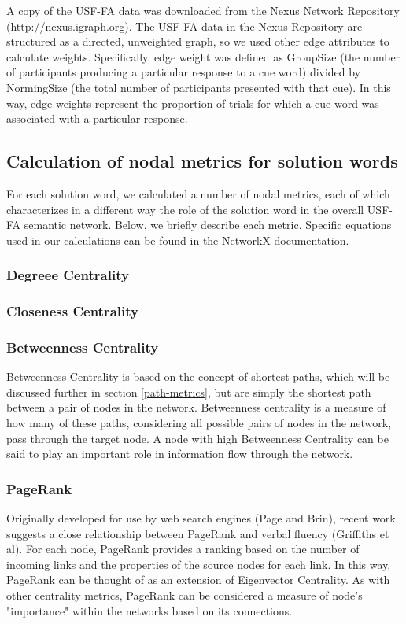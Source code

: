 \documentclass{article} %
\begin{document}
A copy of the USF-FA data was downloaded from the Nexus Network Repository (http://nexus.igraph.org). The USF-FA data in the Nexus Repository are structured as a directed, unweighted graph, so we used other edge attributes to calculate weights. Specifically, edge weight was defined as GroupSize (the number of participants producing a particular response to a cue word) divided by NormingSize (the total number of participants presented with that cue). In this way, edge weights represent the proportion of trials for which a cue word was associated with a particular response.  

\subsection{Calculation of nodal metrics for solution words}

For each solution word, we calculated a number of nodal metrics, each of which characterizes in a different way the role of the solution word in the overall USF-FA semantic network. Below, we briefly describe each metric. Specific equations used in our calculations can be found in the NetworkX documentation.

\subsubsection{Degreee Centrality}

\subsubsection{Closeness Centrality}


\subsubsection{Betweenness Centrality}
Betweenness Centrality is based on the concept of shortest paths, which will be discussed further in section \ref{path-metrics}, but are simply the shortest path between a pair of nodes in the network. Betweenness centrality is a measure of how many of these paths, considering all possible pairs of nodes in the network, pass through the target node. A node with high Betweenness Centrality can be said to play an important role in information flow through the network. 

\subsubsection{PageRank}
Originally developed for use by web search engines (Page and Brin), recent work suggests a close relationship between PageRank and verbal fluency (Griffiths et al). For each node, PageRank provides a ranking based on the number of incoming links and the properties of the source nodes for each link. In this way, PageRank can be thought of as an extension of Eigenvector Centrality. As with other centrality metrics, PageRank can be considered a measure of node's "importance" within the networks based on its connections.
\end{document}
